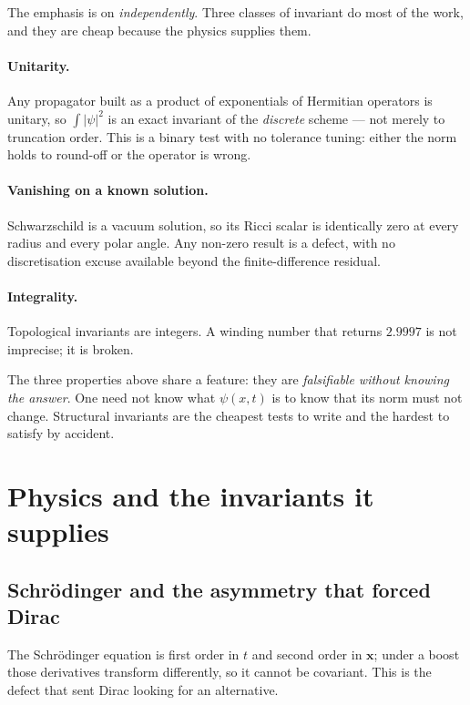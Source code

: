 \documentclass[11pt,a4paper]{article}
\theoremstyle{plain}
\theoremstyle{definition}
\begin{document}
The emphasis is on \emph{independently}. Three classes of invariant do most of
the work, and they are cheap because the physics supplies them.

\paragraph{Unitarity.} Any propagator built as a product of exponentials of
Hermitian operators is unitary, so $\int|\psi|^2$ is an exact invariant of the
\emph{discrete} scheme --- not merely to truncation order. This is a binary test
with no tolerance tuning: either the norm holds to round-off or the operator is
wrong.

\paragraph{Vanishing on a known solution.} Schwarzschild is a vacuum solution,
so its Ricci scalar is identically zero at every radius and every polar angle.
Any non-zero result is a defect, with no discretisation excuse available beyond
the finite-difference residual.

\paragraph{Integrality.} Topological invariants are integers. A winding number
that returns $2.9997$ is not imprecise; it is broken.

\begin{lesson}
The three properties above share a feature: they are \emph{falsifiable without
knowing the answer}. One need not know what $\psi(x,t)$ is to know that its norm
must not change. Structural invariants are the cheapest tests to write and the
hardest to satisfy by accident.
\end{lesson}

\section{Physics and the invariants it supplies}\label{sec:physics}

\subsection{Schr\"odinger and the asymmetry that forced Dirac}

The Schr\"odinger equation is first order in $t$ and second order in $\bm x$;
under a boost those derivatives transform differently, so it cannot be
covariant. This is the defect that sent Dirac looking for an alternative.
\end{document}
